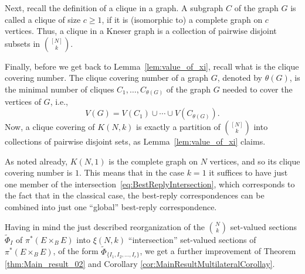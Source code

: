 \documentclass[a4paper,11pt,reqno,english]{amsart}
\theoremstyle{plain}
\theoremstyle{definition}
\begin{document}
\medskip
Next, recall the definition of a clique in a graph.
A subgraph $C$ of the graph $G$ is called a clique of size $c\geq 1$, if it is (isomorphic to) a complete graph on $c$ vertices.
Thus, a clique in a Kneser graph is a collection of pairwise disjoint subsets in $\binom{[N]}{k}$.

\medskip
Finally, before we get back to Lemma~\ref{lem:value_of_xi}, recall what is the clique covering number.
The clique covering number of a graph $G$, denoted by $\theta(G)$, is the minimal number of cliques $C_1,\dots,C_{\theta(G)}$ of the graph $G$ needed to cover the vertices of $G$, i.e.,
\begin{displaymath}
	V(G) = V(C_1)\cup\cdots\cup V(C_{\theta(G)}).
\end{displaymath}
Now, a clique covering of $K(N,k)$ is exactly a partition of $\binom{[N]}{k}$ into collections of pairwise disjoint sets, as Lemma~\ref{lem:value_of_xi} claims.

\medskip
As noted already, $K(N,1)$ is the complete graph on $N$ vertices, and so its clique covering number is $1$.
This means that in the case $k=1$ it suffices to have just one member of the intersection~\eqref{eq:BestReplyIntersection}, which corresponds to the fact that in the classical case, the best-reply correspondences can be combined into just one ``global'' best-reply correspondence.

\medskip
Having in mind the just described reorganization of the $\binom{N}{k}$ set-valued sections $\widetilde{\Phi}_I$ of $\pi^*(E\times_B E)$ into $\xi(N,k)$ ``intersection'' set-valued sections of $\pi^*(E\times_B E)$, of the form $\widetilde{\Phi}_{\{I_1,I_2,\dots,I_r\}}$, we get a further improvement of Theorem \ref{thm:Main_result_02} and Corollary \ref{cor:MainResultMultilateralCorollay}.
\end{document}
